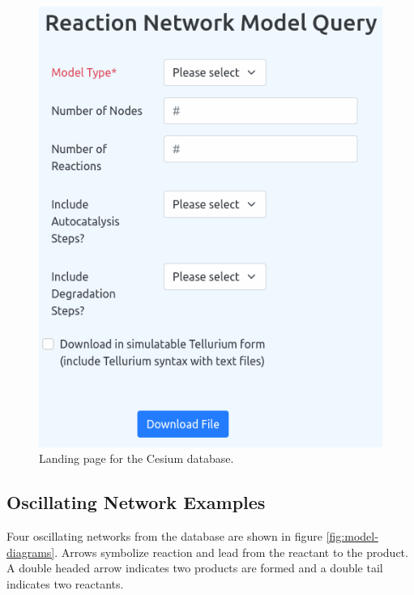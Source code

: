 \documentclass[12pt]{report}
\begin{document}
\begin{figure}
    \centering
    \includegraphics[width=12cm]{images/website.png}
    \caption[Landing page for the Cesium database website]{Landing page for the Cesium database.}
    \label{fig:website}
\end{figure}

\subsection{Oscillating Network Examples}
Four oscillating networks from the database are shown in figure \ref{fig:model-diagrams}. Arrows symbolize reaction and lead from the reactant to the product. A double headed arrow indicates two products are formed and a double tail indicates two reactants. 
\end{document}
